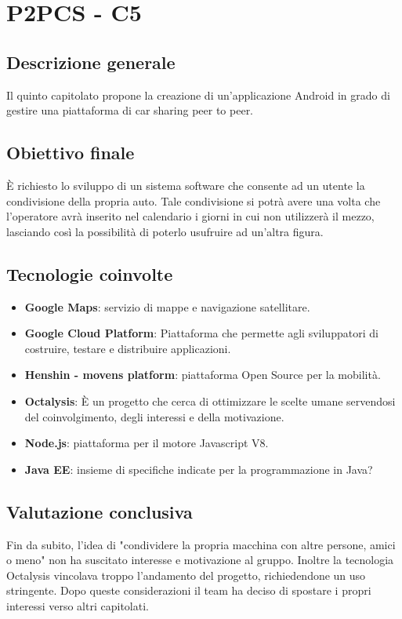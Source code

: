 \section{P2PCS - C5} \label{c5}
    \subsection{Descrizione generale}
    Il quinto capitolato propone la creazione di un'applicazione Android in grado di gestire una piattaforma di car sharing peer to peer.

    \subsection{Obiettivo finale}
    È richiesto lo sviluppo di un sistema software che consente ad un utente la condivisione della propria auto. Tale condivisione si potrà avere una volta che l'operatore avrà inserito nel calendario i giorni in cui non utilizzerà il mezzo, lasciando così la possibilità di poterlo usufruire ad un'altra figura.

    \subsection{Tecnologie coinvolte}
    	\begin{itemize}
    		\item \textbf{Google Maps}: servizio di mappe e navigazione satellitare.
			\item \textbf{Google Cloud Platform}: Piattaforma che permette agli sviluppatori di costruire, testare e distribuire applicazioni.
			\item \textbf{Henshin - movens platform}: piattaforma Open Source per la mobilità.
			\item \textbf{Octalysis}: È un progetto che cerca di ottimizzare le scelte umane servendosi del coinvolgimento, degli interessi e della motivazione.
			\item \textbf{Node.js}: piattaforma per il motore Javascript V8.
			\item \textbf{Java EE}: insieme di specifiche indicate per la programmazione in Java?
	\end{itemize}
	
    \subsection{Valutazione conclusiva}
    Fin da subito, l'idea di "condividere la propria macchina con altre persone, amici o meno" non ha suscitato interesse e motivazione al gruppo. Inoltre la tecnologia Octalysis vincolava troppo l'andamento del progetto, richiedendone un uso stringente. Dopo queste considerazioni il team ha deciso di spostare i propri interessi verso altri capitolati.
